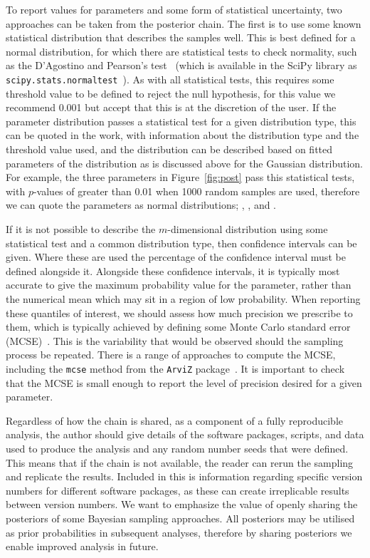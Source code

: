 \documentclass[reprint,superscriptaddress,aps,amsmath]{revtex4-2}
\begin{document}
To report values for parameters and some form of statistical uncertainty, two approaches can be taken from the posterior chain. 
The first is to use some known statistical distribution that describes the samples well.
This is best defined for a normal distribution, for which there are statistical tests to check normality, such as the D'Agostino and Pearson's test~\cite{dagostino_omnibus_1971,dagostino_tests_1973} (which is available in the SciPy library as \texttt{scipy.stats.normaltest}~\cite{virtanen_scipy_2020}).
As with all statistical tests, this requires some threshold value to be defined to reject the null hypothesis, for this value we recommend \num{0.001} but accept that this is at the discretion of the user. 
If the parameter distribution passes a statistical test for a given distribution type, this can be quoted in the work, with information about the distribution type and the threshold value used, and the distribution can be described based on fitted parameters of the distribution as is discussed above for the Gaussian distribution. 
For example, the three parameters in Figure~\ref{fig:post} pass this statistical tests, with $p$-values of greater than \num{0.01} when \num{1000} random samples are used, therefore we can quote the parameters as normal distributions; , , and .

If it is not possible to describe the $m$-dimensional distribution using some statistical test and a common distribution type, then confidence intervals can be given. 
Where these are used the percentage of the confidence interval must be defined alongside it. 
Alongside these confidence intervals, it is typically most accurate to give the maximum probability value for the parameter, rather than the numerical mean which may sit in a region of low probability.
When reporting these quantiles of interest, we should assess how much precision we prescribe to them, which is typically achieved by defining some Monte Carlo standard error (MCSE)~\cite{vehtari_rank_2021}. 
This is the variability that would be observed should the sampling process be repeated. 
There is a range of approaches to compute the MCSE, including the \texttt{mcse} method from the \texttt{ArviZ} package~\cite{kumar_arviz_2019}.
It is important to check that the MCSE is small enough to report the level of precision desired for a given parameter. 

Regardless of how the chain is shared, as a component of a fully reproducible analysis, the author should give details of the software packages, scripts, and data used to produce the analysis and any random number seeds that were defined. 
This means that if the chain is not available, the reader can rerun the sampling and replicate the results. 
Included in this is information regarding specific version numbers for different software packages, as these can create irreplicable results between version numbers. 
We want to emphasize the value of openly sharing the posteriors of some Bayesian sampling approaches. 
All posteriors may be utilised as prior probabilities in subsequent analyses, therefore by sharing posteriors we enable improved analysis in future. 
\end{document}
